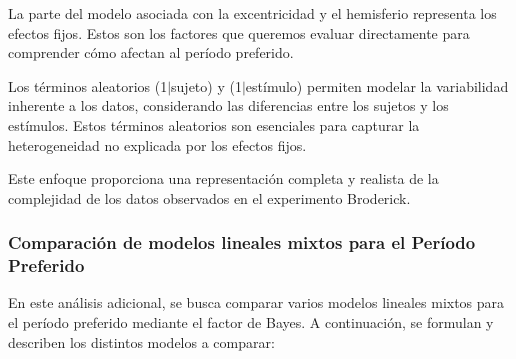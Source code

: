 La parte del modelo asociada con la excentricidad y el hemisferio representa los efectos fijos. Estos son los factores que queremos evaluar directamente para comprender cómo afectan al período preferido.

Los términos aleatorios (1$|$sujeto) y (1$|$estímulo) permiten modelar la variabilidad inherente a los datos, considerando las diferencias entre los sujetos y los estímulos. Estos términos aleatorios son esenciales para capturar la heterogeneidad no explicada por los efectos fijos.

Este enfoque proporciona una representación completa y realista de la complejidad de los datos observados en el experimento Broderick.

\subsubsection{Comparaci\'on de modelos lineales mixtos para el Período Preferido}

En este análisis adicional, se busca comparar varios modelos lineales mixtos para el período preferido mediante el factor de Bayes. A continuación, se formulan y describen los distintos modelos a comparar:

